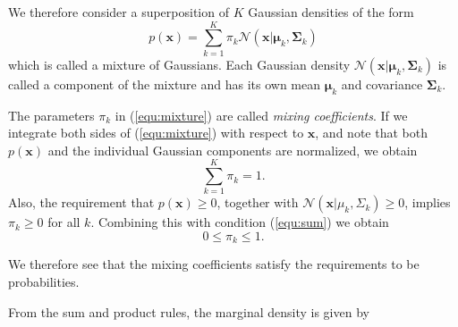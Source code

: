 \documentclass[a4paper, 11pt]{article}
\numberwithin{equation}{subsection}
\begin{document}
We therefore consider a superposition of $K$ Gaussian densities of the form
\begin{equation}\label{equ:mixture}
p(\mathbf x)=\sum_{k=1}^K\pi_k\mathcal N(\mathbf x|\boldsymbol\mu_k,\boldsymbol\Sigma_k)
\end{equation}
which is called a mixture of Gaussians. Each Gaussian density  $\mathcal N(\mathbf x|\boldsymbol\mu_k,\boldsymbol\Sigma_k)$ is called a component of the mixture and has its own mean $\boldsymbol\mu_k$ and covariance $\boldsymbol\Sigma_k$.

The parameters $\pi_k$ in (\ref{equ:mixture}) are called \emph{mixing coefficients}. If we integrate both sides of (\ref{equ:mixture}) with respect to $\mathbf x$, and note that both $p(\mathbf x)$ and the individual Gaussian
components are normalized, we obtain
\begin{equation}\label{equ:sum}
\sum_{k=1}^{K}\pi_k=1.
\end{equation}
Also, the requirement that $p(\mathbf x)\geq 0$, together with $\mathcal N(\mathbf x|\mu_k,\Sigma_k)\geq 0$, implies $\pi_k\geq 0$ for all $k$. Combining this with condition (\ref{equ:sum}) we obtain
\begin{equation}
0\leq\pi_k\leq 1.
\end{equation}

We therefore see that the mixing coefficients satisfy the requirements to be probabilities.

From the sum and product rules, the marginal density is given by
\end{document}
